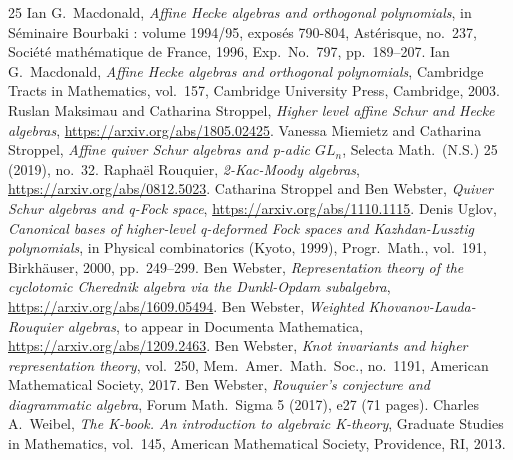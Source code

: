 \documentclass[10pt]{article}
\theoremstyle{definition}
\begin{document}
\begin{thebibliography}{25}
 Ian G.~Macdonald, \emph{Affine Hecke algebras and orthogonal polynomials}, in S\'eminaire Bourbaki : volume 1994/95, expos\'es 790-804, Ast\'erisque, no.~237, Soci\'et\'e math\'ematique de France, 1996, Exp.\ No.~797, pp.~189--207.
 Ian G.~Macdonald, \emph{Affine Hecke algebras and orthogonal polynomials}, Cambridge Tracts in Mathematics, vol.~157, Cambridge University Press, Cambridge, 2003.
 Ruslan Maksimau and Catharina Stroppel, \emph{Higher level affine Schur and Hecke algebras}, \url{https://arxiv.org/abs/1805.02425}.
 Vanessa Miemietz and Catharina Stroppel, \emph{Affine quiver Schur algebras and p-adic $GL_n$}, Selecta Math.\ (N.S.) 25 (2019), no.~32.
 Rapha\"el Rouquier, \emph{2-Kac-Moody algebras}, \url{https://arxiv.org/abs/0812.5023}.
 Catharina Stroppel and Ben Webster, \emph{Quiver Schur algebras and q-Fock space}, \url{https://arxiv.org/abs/1110.1115}.
 Denis Uglov, \emph{Canonical bases of higher-level q-deformed Fock spaces and Kazhdan-Lusztig polynomials}, in Physical combinatorics (Kyoto, 1999), Progr.\ Math., vol.~191, Birkh\"auser, 2000, pp.~249--299.
 Ben Webster, \emph{Representation theory of the cyclotomic Cherednik algebra via the Dunkl-Opdam subalgebra}, \url{https://arxiv.org/abs/1609.05494}.
 Ben Webster, \emph{Weighted Khovanov-Lauda-Rouquier algebras}, to appear in Documenta Mathematica, \url{https://arxiv.org/abs/1209.2463}.
 Ben Webster, \emph{Knot invariants and higher representation theory}, vol.~250, Mem.\ Amer.\ Math.\ Soc., no.~1191, American Mathematical Society, 2017.
 Ben Webster, \emph{Rouquier's conjecture and diagrammatic algebra}, Forum Math.\ Sigma 5 (2017), e27 (71 pages).
 Charles A.~Weibel, \emph{The K-book. An introduction to algebraic K-theory}, Graduate Studies in Mathematics, vol.~145, American Mathematical Society, Providence, RI, 2013.
\end{thebibliography}
\end{document}
